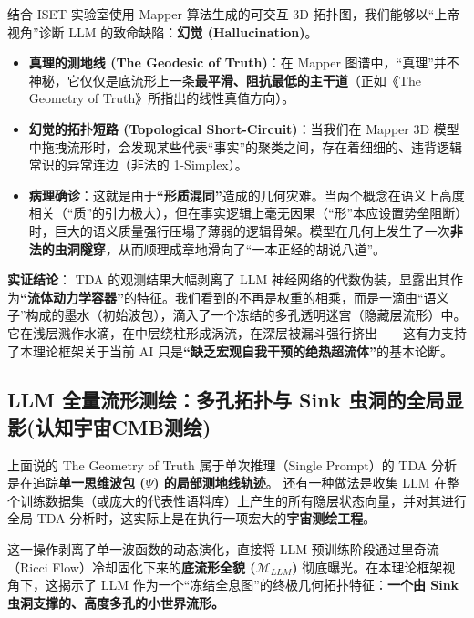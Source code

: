 
结合 ISET 实验室使用 Mapper 算法生成的可交互 3D 拓扑图，我们能够以“上帝视角”诊断 LLM 的致命缺陷：\textbf{幻觉 (Hallucination)}。

\begin{itemize}
    \item \textbf{真理的测地线 (The Geodesic of Truth)}：在 Mapper 图谱中，“真理”并不神秘，它仅仅是底流形上一条\textbf{最平滑、阻抗最低的主干道}（正如《The Geometry of Truth》所指出的线性真值方向）。
    \item \textbf{幻觉的拓扑短路 (Topological Short-Circuit)}：当我们在 Mapper 3D 模型中拖拽流形时，会发现某些代表“事实”的聚类之间，存在着细细的、违背逻辑常识的异常连边（非法的 1-Simplex）。
    \item \textbf{病理确诊}：这就是由于\textbf{“形质混同”}造成的几何灾难。当两个概念在语义上高度相关（“质”的引力极大），但在事实逻辑上毫无因果（“形”本应设置势垒阻断）时，巨大的语义质量强行压塌了薄弱的逻辑骨架。模型在几何上发生了一次\textbf{非法的虫洞隧穿}，从而顺理成章地滑向了“一本正经的胡说八道”。
\end{itemize}

\textbf{实证结论}：
TDA 的观测结果大幅剥离了 LLM 神经网络的代数伪装，显露出其作为\textbf{“流体动力学容器”}的特征。我们看到的不再是权重的相乘，而是一滴由“语义子”构成的墨水（初始波包），滴入了一个冻结的多孔透明迷宫（隐藏层流形）中。它在浅层溅作水滴，在中层绕柱形成涡流，在深层被漏斗强行挤出——这有力支持了本理论框架关于当前 AI 只是\textbf{“缺乏宏观自我干预的绝热超流体”}的基本论断。


\subsection{LLM 全量流形测绘：多孔拓扑与 Sink 虫洞的全局显影(认知宇宙CMB测绘)}
\label{subsec:global_manifold_mapping}

上面说的 The Geometry of Truth 属于单次推理（Single Prompt）的 TDA 分析是在追踪\textbf{单一思维波包 ($\Psi$) 的局部测地线轨迹}。
还有一种做法是收集 LLM 在整个训练数据集（或庞大的代表性语料库）上产生的所有隐层状态向量，并对其进行全局 TDA 分析时，这实际上是在执行一项宏大的\textbf{宇宙测绘工程}。

这一操作剥离了单一波函数的动态演化，直接将 LLM 预训练阶段通过里奇流（Ricci Flow）冷却固化下来的\textbf{底流形全貌 ($\mathcal{M}_{LLM}$)} 彻底曝光。在本理论框架视角下，这揭示了 LLM 作为一个“冻结全息图”的终极几何拓扑特征：\textbf{一个由 Sink 虫洞支撑的、高度多孔的小世界流形。}


